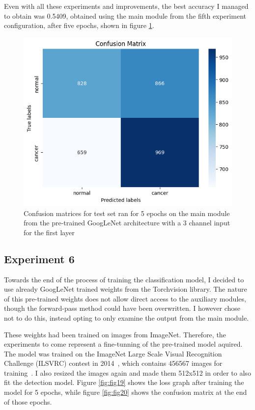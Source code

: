 Even with all these experiments and improvements, the best accuracy I managed to obtain was 0.5409, obtained using the main module from the fifth experiment configuration, after five epochs, shown in figure \ref{fig:fig32}.

\begin{figure}
    \centering
    \includegraphics[width=0.5\linewidth]{figures/Figure39.png}
    \caption{Confusion matrices for test set ran for 5 epochs on the main module from the pre-trained GoogLeNet architecture with a 3 channel input for the first layer}
    \label{fig:fig32}
\end{figure}

\subsection{Experiment 6}

Towards the end of the process of training the classification model, I decided to use already GoogLeNet trained weights from the Torchvision library. The nature of this pre-trained weights does not allow direct access to the auxiliary modules, though the forward-pass method could have been overwritten. I however chose not to do this, instead opting to only examine the output from the main module.
 
These weights had been trained on images from ImageNet. Therefore, the experiments to come represent a fine-tunning of the pre-trained model aquired. The model was trained on the ImageNet Large Scale Visual Recognition Challenge (ILSVRC) contest in 2014~\cite{carte12}, which contains 456567 images for training~\cite{link16}. I also resized the images again and made them 512x512 in order to also fit the detection model. Figure \ref{fig:fig19} shows the loss graph after training the model for 5 epochs, while figure \ref{fig:fig20} shows the confusion matrix at the end of those epochs.

